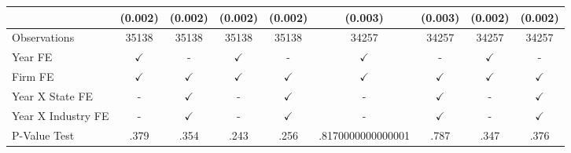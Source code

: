 {\begin{tabular}{l*{8}{c}}
                    &     (0.002)         &     (0.002)         &     (0.002)         &     (0.002)         &     (0.003)         &     (0.003)         &     (0.002)         &     (0.002)         \\
\midrule
Observations        &       35138         &       35138         &       35138         &       35138         &       34257         &       34257         &       34257         &       34257         \\
Year FE             &$\checkmark$         &           -         &$\checkmark$         &           -         &$\checkmark$         &           -         &$\checkmark$         &           -         \\
Firm FE             &$\checkmark$         &$\checkmark$         &$\checkmark$         &$\checkmark$         &$\checkmark$         &$\checkmark$         &$\checkmark$         &$\checkmark$         \\
Year X State FE     &           -         &$\checkmark$         &           -         &$\checkmark$         &           -         &$\checkmark$         &           -         &$\checkmark$         \\
Year X Industry FE  &           -         &$\checkmark$         &           -         &$\checkmark$         &           -         &$\checkmark$         &           -         &$\checkmark$         \\
P-Value Test        &        .379         &        .354         &        .243         &        .256         &.8170000000000001         &        .787         &        .347         &        .376         \\
\bottomrule
\end{tabular}
}
